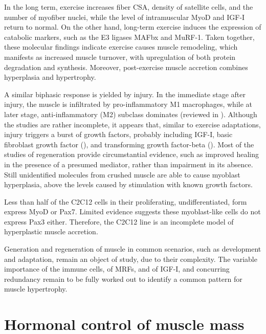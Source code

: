 \documentclass[12pt,english]{report}\usepackage[]{graphicx}\usepackage[]{color}
\begin{document}
In the long term, exercise increases fiber CSA, density of satellite
cells, and the number of myofiber nuclei, while the level of intramuscular
MyoD and IGF-I return to normal\citep{hanssen2013effect}. On the
other hand, long-term exercise induces the expression of catabolic
markers, such as the E3 ligases MAFbx and MuRF-1\citep{stefanetti2014regulation}.
Taken together, these molecular findings indicate exercise causes
muscle remodeling, which manifests as increased muscle turnover, with
upregulation of both protein degradation and synthesis. Moreover,
post-exercise muscle accretion combines hyperplasia and hypertrophy.

A similar biphasic response is yielded by injury. In the immediate
stage after injury, the muscle is infiltrated by pro-inflammatory
M1 macrophages, while at later stage, anti-inflammatory (M2) subclass
dominates (reviewed in \citep{rigamonti2014macrophage}). Although
the studies are rather incomplete, it appears that, similar to exercise
adaptations, injury triggers a burst of growth factors, probably including
IGF-I, basic fibroblast growth factor (),
and transforming growth factor-beta ()\citep{robertson1993role}.
Most of the studies of regeneration provide circumstantial evidence,
such as improved healing in the presence of a presumed mediator, rather
than impairment in its absence. Still unidentified molecules from
crushed muscle are able to cause myoblast hyperplasia, above the levels
caused by stimulation with known growth factors\citep{haugk1995regulation}. 

Less than half of the C2C12 cells in their proliferating, undifferentiated,
form express MyoD or Pax7\citep{olguin2004pax-7}. Limited evidence
suggests these myoblast-like cells do not express Pax3 either\citep{epstein1995pax3}.
Therefore, the C2C12 line is an incomplete model of hyperplastic muscle
accretion.

Generation and regeneration of muscle in common scenarios, such as
development and adaptation, remain an object of study, due to their
complexity. The variable importance of the immune cells, of MRFs,
and of IGF-I, and concurring redundancy remain to be fully worked
out to identify a common pattern for muscle hypertrophy.


\section{Hormonal control of muscle mass}
\end{document}
